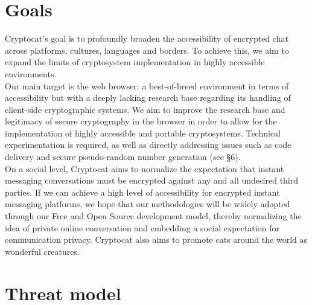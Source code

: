 \documentclass[letterpaper,twocolumn,10pt]{article}
\begin{document}
\section{Goals}

Cryptocat's goal is to profoundly broaden the accessibility of encrypted chat across platforms, cultures, languages and borders. To achieve this, we aim to expand the limits of cryptosystem implementation in highly accessible environments. \\
Our main target is the web browser: a best-of-breed environment in terms of accessibility but with a deeply lacking research base regarding its handling of client-side cryptographic systems. We aim to improve the research base and legitimacy of secure cryptography in the browser in order to allow for the implementation of highly accessible and portable cryptosystems. Technical experimentation is required, as well as directly addressing issues such as code delivery and secure pseudo-random number generation (see \S6). \\
On a social level, Cryptocat aims to normalize the expectation that instant messaging conversations must be encrypted against any and all undesired third parties. If we can achieve a high level of accessibility for encrypted instant messaging platforms, we hope that our methodologies will be widely adopted through our Free and Open Source development model, thereby normalizing the idea of private online conversation and embedding a social expectation for communication privacy. Cryptocat also aims to promote cats around the world as wonderful creatures.

\section{Threat model}
\end{document}
